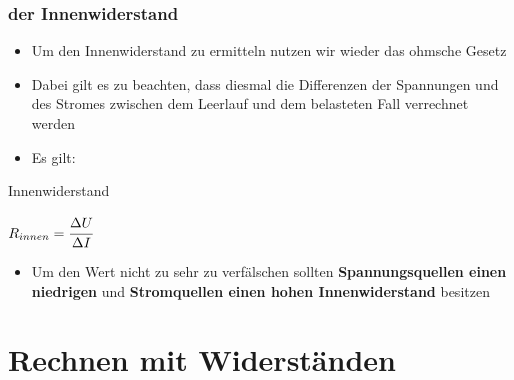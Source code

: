 \begin{frame}
  \frametitle{der Innenwiderstand}
  \begin{itemize}
    \item	Um den Innenwiderstand zu ermitteln nutzen wir wieder das ohmsche Gesetz
    \item	Dabei gilt es zu beachten, dass diesmal die Differenzen der Spannungen und des Stromes zwischen dem Leerlauf und dem belasteten Fall verrechnet werden
    \item	Es gilt:
  \end{itemize}
  \begin{block}{Innenwiderstand}
    \begin{center}
      $R_{innen} = \cfrac{\Delta U}{\Delta I}$
    \end{center}
  \end{block}
  \begin{itemize}
    \item	Um den Wert nicht zu sehr zu verfälschen sollten \textbf{Spannungsquellen einen niedrigen} und \textbf{Stromquellen einen hohen Innenwiderstand} besitzen
  \end{itemize}
\end{frame}


\section{Rechnen mit Widerständen}

